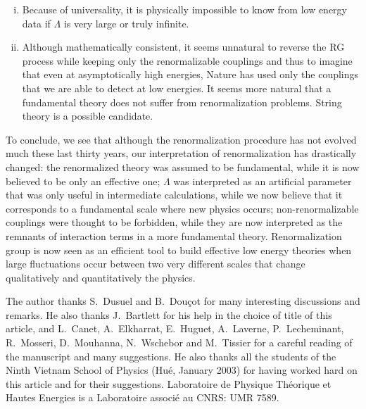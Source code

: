 \documentclass[floatfix,twocolumn,preprintnumbers,amsmath,amssymb,prb]{revtex4}
\begin{document}
{{\begin{enumerate}[(i)]
\item Because of universality, it is physically impossible to know from low
energy data if $\Lambda$ is very large or truly infinite.

\item Although mathematically consistent, it seems unnatural to
reverse the RG process while keeping only the renormalizable
couplings and thus to imagine that even at asymptotically high
energies, Nature has used only the couplings that we are able to
detect at low energies. It seems more natural that a fundamental
theory does not suffer from renormalization problems. String
theory is a possible candidate.\cite{schmidhuber97}

\end{enumerate}

To conclude, we see that although the renormalization procedure has
not evolved much these last thirty years, our interpretation of 
renormalization has drastically changed\cite{lepage89}: the
renormalized theory was assumed to be fundamental, while it is now
believed to be only an effective one; $\Lambda$ was interpreted as
an artificial parameter that was only useful in intermediate
calculations, while we now believe that it corresponds to a
fundamental scale where new physics occurs; non-renormalizable
couplings were thought to be forbidden, while they are now
interpreted as the remnants of interaction terms in a more
fundamental theory. Renormalization group is now seen as
an efficient tool to build effective low energy theories when
large fluctuations occur between two very different scales that
change qualitatively and quantitatively the physics.

\begin{acknowledgments}
The author thanks S.\ Dusuel and B.\ Dou\c{c}ot for many interesting
discussions and remarks. He also thanks J.\ Bartlett for his help
in the choice of title of this article, and L.\ Canet, A.\
Elkharrat, E.\ Huguet, A.\ Laverne, P.\ Lecheminant, R.\ Mosseri,
D.\ Mouhanna, N.\ Wschebor and M.\ Tissier for a careful reading
of the manuscript and many suggestions. He also thanks all the
students of the Ninth Vietnam School of Physics (Hu\'e, January
2003) for having worked hard on this article and for their
suggestions. Laboratoire de Physique Th\'eorique et Hautes Energies
is a Laboratoire associ\'e au CNRS: UMR 7589.
\end{acknowledgments}

\appendix
}}
\end{document}
